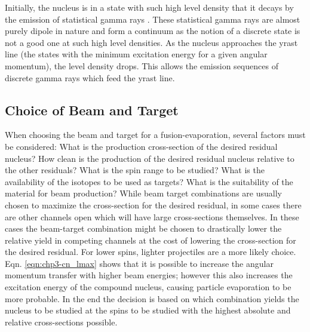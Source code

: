 Initially, the nucleus is in a state with such high level density that it decays by the emission of statistical gamma rays \cite{cnCooling}. These statistical gamma rays are almost purely dipole in nature and form a continuum as the notion of a discrete state is not a good one at such high level densities. As the nucleus approaches the yrast line (the states with the minimum excitation energy for a given angular momentum), the level density drops. This allows the emission sequences of discrete gamma rays which feed the yrast line.

\subsection{Choice of Beam and Target}
\label{ssec:exp-pr-fus-evap-beam-target}
When choosing the beam and target for a fusion-evaporation, several factors must be considered: What is the production cross-section of the desired residual nucleus? How clean is the production of the desired residual nucleus relative to the other residuals? What is the spin range to be studied? What is the availability of the isotopes to be used as targets? What is the suitability of the material for beam production? While beam target combinations are usually chosen to maximize the cross-section for the desired residual, in some cases there are other channels open which will have large cross-sections themselves. In these cases the beam-target combination might be chosen to drastically lower the relative yield in competing channels at the cost of lowering the cross-section for the desired residual. For lower spins, lighter projectiles are a more likely choice. Eqn. \ref{eqn:chp3-cn_lmax} shows that it is possible to increase the angular momentum transfer with higher beam energies; however this also increases the excitation energy of the compound nucleus, causing particle evaporation to be more probable. In the end the decision is based on which combination yields the nucleus to be studied at the spins to be studied with the highest absolute and relative cross-sections possible.

